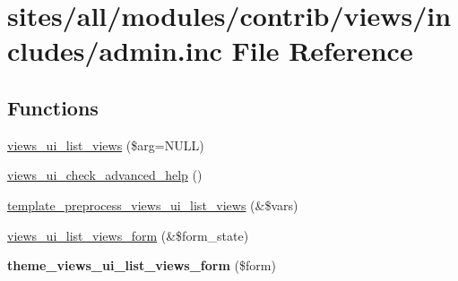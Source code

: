 \hypertarget{admin_8inc}{
\section{sites/all/modules/contrib/views/includes/admin.inc File Reference}
\label{admin_8inc}
}
\subsection*{Functions}
\begin{CompactItemize}
\item 
\hyperlink{admin_8inc_aab40d1cdd76cf120dd01aa63a3944e9}{views\_\-ui\_\-list\_\-views} (\$arg=NULL)
\item 
\hyperlink{admin_8inc_def4f03f528e350d8153839789f69335}{views\_\-ui\_\-check\_\-advanced\_\-help} ()
\item 
\hyperlink{admin_8inc_e57b4aeb4a4c585ed098eec748cdee3f}{template\_\-preprocess\_\-views\_\-ui\_\-list\_\-views} (\&\$vars)
\item 
\hyperlink{admin_8inc_3f7e4656b6cc3f6b246e20a044f09504}{views\_\-ui\_\-list\_\-views\_\-form} (\&\$form\_\-state)
\item 
\hypertarget{admin_8inc_697df8d38aaee963afd2b1213a278c16}{
\textbf{theme\_\-views\_\-ui\_\-list\_\-views\_\-form} (\$form)}
\label{admin_8inc_697df8d38aaee963afd2b1213a278c16}


\end{CompactItemize}
